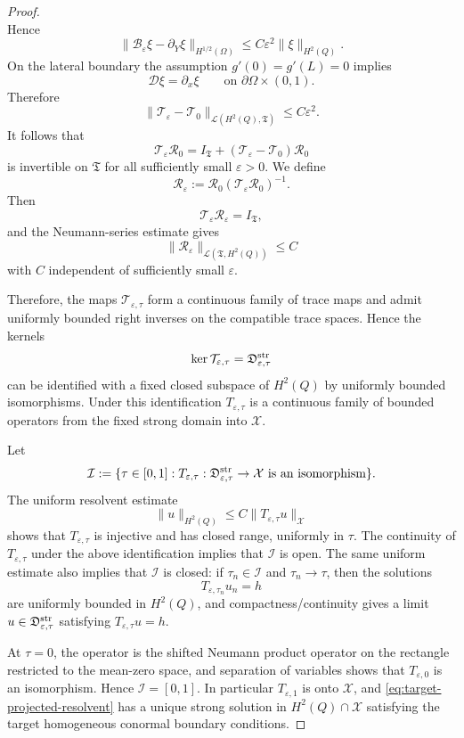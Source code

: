 \documentclass[11pt]{article}
\theoremstyle{definition}
\theoremstyle{remark}
\numberwithin{equation}{section}
\newcommand{\mc}[1]{\mathcal{#1}}
\begin{document}
\begin{proof}
\[\]
Hence
\[
\|\mathcal B_\varepsilon\xi-\partial_Y\xi\|_{H^{1/2}(\Omega)}
\le C\varepsilon^2\|\xi\|_{H^2(Q)}.
\]
On the lateral boundary the assumption \(g'(0)=g'(L)=0\) implies
\[
\mathcal D\xi=\partial_x\xi
\qquad\text{on }\partial\Omega\times(0,1).
\]
Therefore
\[
\|\mathcal T_\varepsilon-\mathcal T_0\|_{\mathcal L(H^2(Q),\mathfrak T)}
\le C\varepsilon^2 .
\]
It follows that
\[
\mathcal T_\varepsilon\mathcal R_0
=
I_{\mathfrak T}
+
(\mathcal T_\varepsilon-\mathcal T_0)\mathcal R_0
\]
is invertible on \(\mathfrak T\) for all sufficiently small
\(\varepsilon>0\). We define
\[
\mathcal R_\varepsilon
:=
\mathcal R_0
(\mathcal T_\varepsilon\mathcal R_0)^{-1}.
\]
Then
\[
\mathcal T_\varepsilon\mathcal R_\varepsilon=I_{\mathfrak T},
\]
and the Neumann-series estimate gives
\[
\|\mathcal R_\varepsilon\|_{\mathcal L(\mathfrak T,H^2(Q))}
\le C
\]
with \(C\) independent of sufficiently small \(\varepsilon\).

Therefore, the maps \(\mathcal T_{\varepsilon,\tau}\)
form a continuous family of trace maps and admit uniformly bounded right
inverses on the compatible trace spaces. 
Hence the kernels
\[
\ker\mathcal T_{\varepsilon,\tau}
=
\mathfrak D_{\varepsilon,\tau}^{\rm str}
\]
can be identified with a fixed closed subspace of \(H^2(Q)\) by uniformly
bounded isomorphisms. Under this identification $T_{\varepsilon,\tau}$
is a continuous family of bounded operators from the fixed strong domain into
\(\mc X\).

Let
\[
\mathcal I
:=
\{\tau\in[0,1]:T_{\varepsilon,\tau}:
\mathfrak D_{\varepsilon,\tau}^{\rm str}\to\mc X
\text{ is an isomorphism}\}.
\]
The uniform resolvent estimate
\[
\|u\|_{H^2(Q)}
\le C\|T_{\varepsilon,\tau}u\|_{\mc X}
\]
shows that \(T_{\varepsilon,\tau}\) is injective and has closed range, uniformly
in \(\tau\). The continuity of \(T_{\varepsilon,\tau}\) under the above
identification implies that \(\mathcal I\) is open. The same uniform estimate
also implies that \(\mathcal I\) is closed: if \(\tau_n\in\mathcal I\) and
\(\tau_n\to\tau\), then the solutions
\[
T_{\varepsilon,\tau_n}u_n=h
\]
are uniformly bounded in \(H^2(Q)\), and compactness/continuity gives a limit
\(u\in\mathfrak D_{\varepsilon,\tau}^{\rm str}\) satisfying
\(T_{\varepsilon,\tau}u=h\).

At \(\tau=0\), the operator is the shifted Neumann product operator on the
rectangle restricted to the mean-zero space, and separation of variables shows
that \(T_{\varepsilon,0}\) is an isomorphism. Hence \(\mathcal I=[0,1]\).
In particular \(T_{\varepsilon,1}\) is onto \(\mc X\), and
\eqref{eq:target-projected-resolvent} has a unique strong solution in
\(H^2(Q)\cap\mc X\) satisfying the target homogeneous conormal boundary
conditions.


\end{proof}
\end{document}
